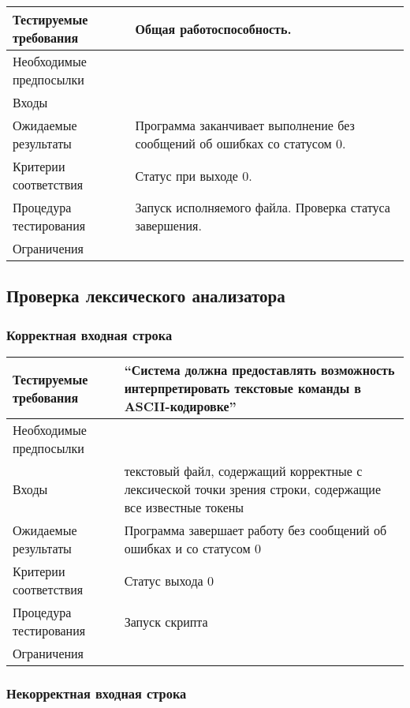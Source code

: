 \documentclass[a4paper, 12pt]{article}
\begin{document}
\begin{tabular}{|l|p{4in}|}
	\hline
	Тестируемые требования	&Общая работоспособность.\\
	\hline
	Необходимые предпосылки	&\\
	\hline
	Входы			&\\
	\hline
	Ожидаемые результаты	&Программа заканчивает выполнение без сообщений об ошибках со статусом 0.\\
	\hline
	Критерии соответствия	&Статус при выходе 0.\\
	\hline
	Процедура тестирования	&Запуск исполняемого файла. Проверка статуса завершения.\\
	\hline
	Ограничения		&\\
	\hline
\end{tabular}

\subsection{Проверка лексического анализатора} %

\subsubsection{Корректная входная строка} %

\begin{tabular}{|l|p{4in}|}
	\hline
	Тестируемые требования	&``Система должна предоставлять возможность интерпретировать текстовые
	команды в ASCII-кодировке''\\
	\hline
	Необходимые предпосылки	&\\
	\hline
	Входы			&текстовый файл, содержащий корректные с лексической точки
	зрения строки, содержащие все известные токены\\
	\hline
	Ожидаемые результаты	&Программа завершает работу без сообщений об ошибках и со статусом 0\\
	\hline
	Критерии соответствия	&Статус выхода 0\\
	\hline
	Процедура тестирования	&Запуск скрипта\\
	\hline
	Ограничения		&\\
	\hline
\end{tabular}

\subsubsection{Некорректная входная строка} %
\end{document}
